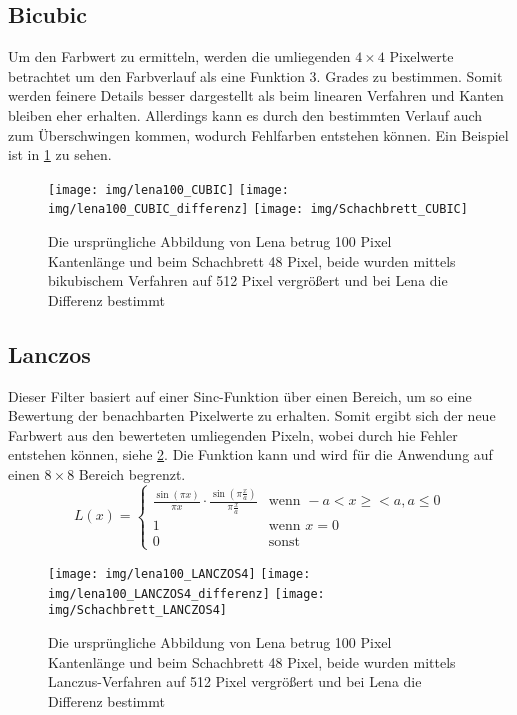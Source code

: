 \subsection{Bicubic}
Um den Farbwert zu ermitteln, werden die umliegenden $4\times 4$ Pixelwerte betrachtet um den Farbverlauf als eine Funktion 3. Grades zu bestimmen. Somit werden feinere Details besser dargestellt als beim linearen Verfahren und Kanten bleiben eher erhalten. Allerdings kann es durch den bestimmten Verlauf auch zum Überschwingen kommen, wodurch Fehlfarben entstehen können. Ein Beispiel ist in \ref{img_Bicubic} zu sehen.
\cite{wiki_Bicubic}
\begin{figure}
	\centering
	\texttt{[image: img/lena100\_CUBIC]}
	\texttt{[image: img/lena100\_CUBIC\_differenz]}
	\texttt{[image: img/Schachbrett\_CUBIC]}
	\caption{Die ursprüngliche Abbildung von Lena betrug 100 Pixel Kantenlänge und beim Schachbrett 48 Pixel, beide wurden mittels bikubischem Verfahren auf 512 Pixel vergrößert und bei Lena die Differenz bestimmt}
	\label{img_Bicubic}
\end{figure}
\subsection{Lanczos}
Dieser Filter basiert auf einer Sinc-Funktion über einen Bereich, um so eine Bewertung der benachbarten Pixelwerte zu erhalten. Somit ergibt sich der neue Farbwert aus den bewerteten umliegenden Pixeln, wobei durch hie Fehler entstehen können, siehe \ref{img_Lanczos}. Die Funktion kann und wird für die Anwendung auf einen $8\times 8$ Bereich begrenzt. \cite{wiki_Lanczos}
\[ L(x)= \left\{ \begin{array}{ll}
\frac{\sin(\pi x)}{\pi x} \cdot \frac{\sin(\pi \frac{x}{a})}{\pi \frac{x}{a}} & \textrm{wenn } -a < x \ge<a, a\leq 0\\
1 & \textrm{wenn } x = 0\\
0 & \textrm{sonst}
\end{array}\right. \]
\begin{figure}
	\centering
	\texttt{[image: img/lena100\_LANCZOS4]}
	\texttt{[image: img/lena100\_LANCZOS4\_differenz]}
	\texttt{[image: img/Schachbrett\_LANCZOS4]}
	\caption{Die ursprüngliche Abbildung von Lena betrug 100 Pixel Kantenlänge und beim Schachbrett 48 Pixel, beide wurden mittels Lanczus-Verfahren auf 512 Pixel vergrößert und bei Lena die Differenz bestimmt}
	\label{img_Lanczos}
\end{figure}
